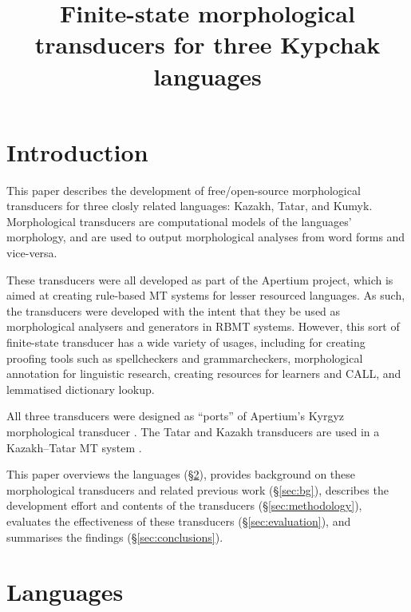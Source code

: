 \documentclass[a4paper,11pt,twocolumn]{article}
\title{Finite-state morphological transducers for three Kypchak languages}
\begin{document}
\maketitleabstract{}

\section{Introduction}

This paper describes the development of free/open-source morphological transducers for three closly related languages: Kazakh, Tatar, and Kumyk.  Morphological transducers are computational models of the languages' morphology, and are used to output morphological analyses from word forms and vice-versa.

These transducers were all developed as part of the Apertium project, which is aimed at creating rule-based MT systems for lesser resourced languages.  As such, the transducers were developed with the intent that they be used as morphological analysers and generators in RBMT systems.  However, this sort of finite-state transducer has a wide variety of usages, including for creating proofing tools such as spellcheckers and grammarcheckers, morphological annotation for linguistic research, creating resources for learners and CALL, and lemmatised dictionary lookup.


All three transducers were designed as ``ports'' of Apertium's Kyrgyz morphological transducer \citep{washington2012}.  The Tatar and Kazakh transducers are used in a Kazakh--Tatar MT system \citep{salimzyanov2013}.


This paper overviews the languages (§\ref{sec:lgs}), provides background on these morphological transducers and related previous work (§\ref{sec:bg}), describes the development effort and contents of the transducers (§\ref{sec:methodology}), evaluates the effectiveness of these transducers (§\ref{sec:evaluation}), and summarises the findings (§\ref{sec:conclusions}).

\section{Languages}\label{sec:lgs}
\end{document}
